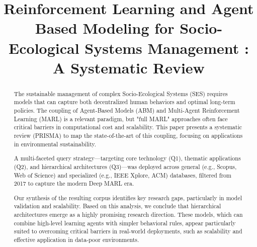 \documentclass[conference]{IEEEtran}
\begin{document}
\title{Reinforcement Learning and Agent Based Modeling for Socio-Ecological Systems Management : A Systematic Review}

\author{
\and
{}
\and
{}
\and
{}
}

\maketitle

\begin{abstract}
The sustainable management of complex Socio-Ecological Systems (SES) requires models that can capture both decentralized human behaviors and optimal long-term policies. The coupling of Agent-Based Models (ABM) and Multi-Agent Reinforcement Learning (MARL) is a relevant paradigm, but "full MARL" approaches often face critical barriers in computational cost and scalability. This paper presents a systematic review (PRISMA) to map the state-of-the-art of this coupling, focusing on applications in environmental sustainability.

A multi-faceted query strategy—targeting core technology (Q1), thematic applications (Q2), and hierarchical architectures (Q3)—was deployed across general (e.g., Scopus, Web of Science) and specialized (e.g., IEEE Xplore, ACM) databases, filtered from 2017 to capture the modern Deep MARL era.

Our synthesis of the resulting corpus identifies key research gaps, particularly in model validation and scalability. Based on this analysis, we conclude that hierarchical architectures emerge as a highly promising research direction. These models, which can combine high-level learning agents with simpler behavioral rules, appear particularly suited to overcoming critical barriers in real-world deployments, such as scalability and effective application in data-poor environments.
\end{abstract}
\end{document}
